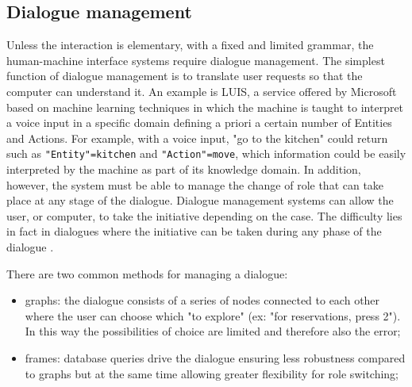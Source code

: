 \documentclass{thesisreport}
\begin{document}
 \subsection{Dialogue management}
 Unless the interaction is elementary, with a fixed and limited grammar, the human-machine interface systems require dialogue management.
 The simplest function of dialogue management is to translate user requests so that the computer can understand it. An example is LUIS, a service offered by Microsoft based on machine learning techniques in which the machine is taught to interpret a voice input in a specific domain defining a priori a certain number of Entities and Actions. For example, with a voice input, "go to the kitchen" could return such as \texttt{"Entity"=kitchen} and \texttt{"Action"=move}, which information could be easily interpreted by the machine as part of its knowledge domain.
 In addition, however, the system must be able to manage the change of role that can take place at any stage of the dialogue. Dialogue management systems can allow the user, or computer, to take the initiative depending on the case. The difficulty lies in fact in dialogues where the initiative can be taken during any phase of the dialogue \cite{churcher1997dialogue}.

 There are two common methods for managing a dialogue:
 \begin{itemize}
     \item graphs: the dialogue consists of a series of nodes connected to each other where the user can choose which "to explore" (ex: "for reservations, press 2"). In this way the possibilities of choice are limited and therefore also the error;
     \item frames: database queries drive the dialogue ensuring less robustness compared to graphs but at the same time allowing greater flexibility for role switching;
 \end{itemize}
 
\end{document}
